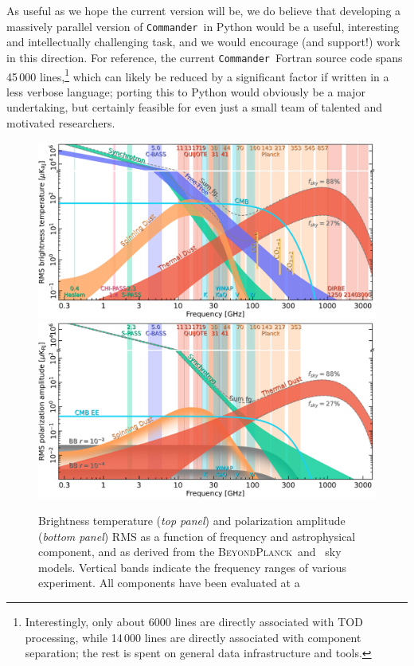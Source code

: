 \documentclass[twocolumn]{aa}
\def\commander{\texttt{Commander}}
\newcommand{\BP}{\textsc{BeyondPlanck}}
\begin{document}
As useful as we hope the current version will be, we do believe that
developing a massively parallel version of \commander\ in Python would
be a useful, interesting and intellectually challenging task, and we
would encourage (and support!) work in this direction. For reference,
the current \commander\ Fortran source code spans 45\,000
lines,\footnote{Interestingly, only about 6000 lines are directly
  associated with TOD processing, while 14\,000 lines are directly
  associated with component separation; the rest is spent on general
  data infrastructure and tools.} which can likely be reduced by a
significant factor if written in a less verbose language; porting this
to Python would obviously be a major undertaking, but certainly
feasible for even just a small team of talented and motivated
researchers.

\begin{figure}[t]
  \center
  \includegraphics[width=0.9\linewidth]{figs/spectrum_long.pdf}
  \includegraphics[width=0.9\linewidth]{figs/spectrum_pol_long.pdf}
  \caption{Brightness temperature (\emph{top panel}) and polarization
    amplitude (\emph{bottom panel}) RMS as a function of frequency and
    astrophysical component, and as derived from the \BP\ and
    \Planck\ sky models. Vertical bands indicate the frequency ranges
    of various experiment. All components have been evaluated at a
}
\end{figure}
\end{document}
